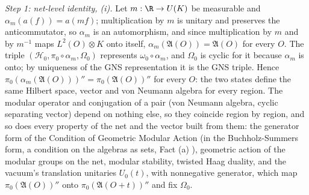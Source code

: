 \emph{Step 1: net-level identity, (i).} Let $m : \R \to U(K)$ be measurable and $\alpha_{m}(a(f)) = a(mf)$; multiplication by $m$ is unitary and preserves the anticommutator, so $\alpha_{m}$ is an automorphism, and since multiplication by $m$ and by $m^{-1}$ maps $L^{2}(O)\otimes K$ onto itself, $\alpha_{m}(\mathfrak{A}(O)) = \mathfrak{A}(O)$ for every $O$. The triple $(\mathcal{H}_{0}, \pi_{0}\circ\alpha_{m}, \Omega_{0})$ represents $\omega_{0}\circ\alpha_{m}$, and $\Omega_{0}$ is cyclic for it because $\alpha_{m}$ is onto; by uniqueness of the GNS representation it is the GNS triple. Hence $\pi_{0}(\alpha_{m}(\mathfrak{A}(O)))'' = \pi_{0}(\mathfrak{A}(O))''$ for every $O$: the two states define the same Hilbert space, vector and von Neumann algebra for every region. The modular operator and conjugation of a pair (von Neumann algebra, cyclic separating vector) depend on nothing else, so they coincide region by region, and so does every property of the net and the vector built from them: the generator form of the Condition of Geometric Modular Action (in the Buchholz-Summers form, a condition on the algebras as sets, Fact (a) \cite{BuchholzFlorigSummers1999, BuchholzSummers1993}), geometric action of the modular groups on the net, modular stability, twisted Haag duality, and the vacuum's translation unitaries $U_{0}(t)$, with nonnegative generator, which map $\pi_{0}(\mathfrak{A}(O))''$ onto $\pi_{0}(\mathfrak{A}(O + t))''$ and fix $\Omega_{0}$.

